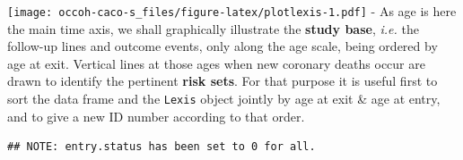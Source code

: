 \documentclass[
]{book}
\newenvironment{Shaded}{\begin{snugshade}}{\end{snugshade}}
\newcommand{\AttributeTok}[1]{\textcolor[rgb]{0.13,0.29,0.53}{#1}}
\newcommand{\ConstantTok}[1]{\textcolor[rgb]{0.56,0.35,0.01}{#1}}
\newcommand{\DecValTok}[1]{\textcolor[rgb]{0.00,0.00,0.81}{#1}}
\newcommand{\FunctionTok}[1]{\textcolor[rgb]{0.13,0.29,0.53}{\textbf{#1}}}
\newcommand{\NormalTok}[1]{#1}
\newcommand{\OtherTok}[1]{\textcolor[rgb]{0.56,0.35,0.01}{#1}}
\newcommand{\SpecialCharTok}[1]{\textcolor[rgb]{0.81,0.36,0.00}{\textbf{#1}}}
\begin{document}
\begin{Shaded}
\end{Shaded}

\texttt{[image: occoh-caco-s\_files/figure-latex/plotlexis-1.pdf]}
- As age is here the main time axis,
we shall graphically illustrate the \textbf{study base}, \emph{i.e.}
the follow-up lines and outcome events,
only along the age scale, being ordered by age at exit.
Vertical lines at those ages when new coronary
deaths occur are drawn to identify the pertinent
\textbf{risk sets}. For that purpose it is useful first
to sort the data frame and the \texttt{Lexis} object
jointly by age at exit \& age at entry,
and to give a new ID number according to that order.

\begin{Shaded}
\end{Shaded}

\begin{verbatim}
## NOTE: entry.status has been set to 0 for all.
\end{verbatim}
\end{document}
